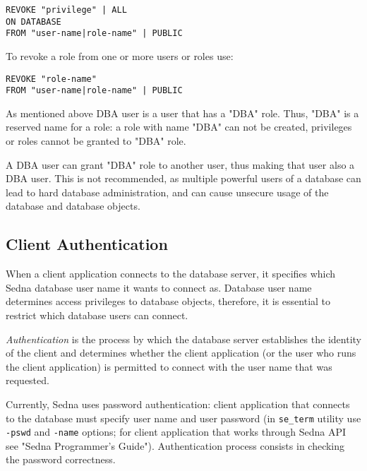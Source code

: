 \documentclass[a4paper,12pt]{article}
\begin{document}

\begin{verbatim}
REVOKE "privilege" | ALL
ON DATABASE 
FROM "user-name|role-name" | PUBLIC
\end{verbatim}

To revoke a role from one or more users or roles use:


\begin{verbatim}
REVOKE "role-name" 
FROM "user-name|role-name" | PUBLIC
\end{verbatim}

As mentioned above DBA user is a user that has a "DBA" role. Thus, "DBA" is a reserved name for a role: a role with name "DBA" can not be created, privileges or roles cannot be granted to "DBA" role.

A DBA user can grant "DBA" role to another user, thus making that user also a DBA user. This is not recommended, as multiple powerful users of a database can lead to hard database administration, and can cause unsecure usage of the database and database objects.


\subsection{Client Authentication}

When a client application connects to the database server, it specifies which Sedna database user name it wants to connect as. Database user name determines access privileges to database objects, therefore, it is essential to restrict which database users can connect.

\emph{Authentication} is the process by which the database server establishes the identity of the client and determines whether the client application (or the user who runs the client application) is permitted to connect with the user name that was requested.

Currently, Sedna uses password authentication: client application that connects to the database must specify user name and user password (in \verb!se_term! utility use \verb!-pswd! and \verb!-name! options; for client application that works through Sedna API see "Sedna Programmer's Guide"). Authentication process consists in checking the password correctness.
\end{document}
